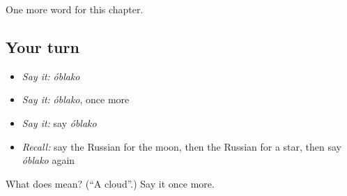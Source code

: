 \begin{grammarlens}[title={What you've built}]
One more word for this chapter.
\end{grammarlens}

\subsection*{Your turn}
\begin{itemize}
\raggedright
  \item \emph{Say it:} \emph{óblako}
  \item \emph{Say it:} \emph{óblako}, once more
  \item \emph{Say it:} say \emph{óblako}
  \item \emph{Recall:} say the Russian for the moon, then the Russian for a star, then say \emph{óblako} again
\end{itemize}

\begin{tcolorbox}[breakable,colback=teal!4,colframe=teal!35!black,title={Before you move on}]
What does  mean? (\textquotedblleft{}A cloud\textquotedblright{}.) Say it once more.
\end{tcolorbox}
